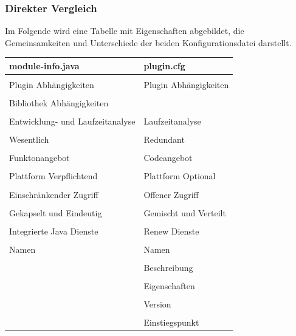 		\subsubsection{Direkter Vergleich} \label{sub:Direkter_Vergleich}
			Im Folgende wird eine Tabelle mit Eigenschaften abgebildet, die Gemeinsamkeiten und Unterschiede der beiden Konfigurationsdatei darstellt.\bigbreak
			\begin{table}[!h]
			\centering
			\begin{tabular}{l|l}
				\textbf{module-info.java} & \textbf{plugin.cfg} \\
				\hline
				\\[-1em]
				Plugin Abhängigkeiten & Plugin Abhängigkeiten \\
				\\[-1em]
			    Bibliothek Abhängigkeiten & \\
			    \\[-1em]
			    Entwicklung- und Laufzeitanalyse & Laufzeitanalyse \\
			    \\[-1em]
			    Wesentlich & Redundant \\
			    \\[-1em]
			    Funktonangebot & Codeangebot \\
			    \\[-1em]
			    Plattform Verpflichtend & Plattform Optional \\
			    \\[-1em]
			    Einschränkender Zugriff & Offener Zugriff \\
			    \\[-1em]
			    Gekapselt und Eindeutig & Gemischt und Verteilt \\
			    \\[-1em]
			    Integrierte Java Dienste & Renew Dienste \\
			    \\[-1em]
			    Namen & Namen \\
			    \\[-1em]
			    & Beschreibung \\
			    \\[-1em]
			    & Eigenschaften \\
			    \\[-1em]
			    & Version \\
			    \\[-1em]
			    & Einstiegspunkt
			    \\[-1em]
			\end{tabular}
			\end{table}

